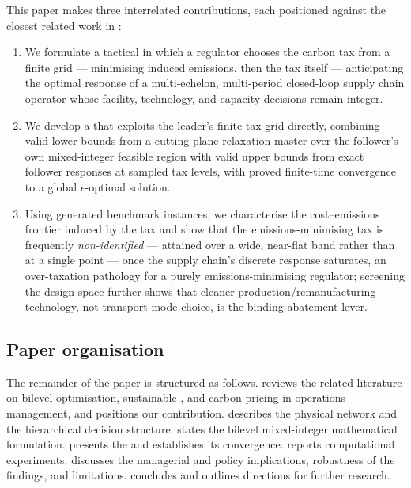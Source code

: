 This paper makes three interrelated contributions, each positioned
against the closest related work in :
\begin{enumerate}
  \item We formulate a tactical \BLMIP in which a regulator
        chooses the carbon tax from a finite grid --- minimising
        induced emissions, then the tax itself --- anticipating the
        optimal response of a multi-echelon, multi-period closed-loop
        supply chain operator whose facility, technology, and
        capacity decisions remain integer.
  \item We develop a \DBP that exploits the leader's
        finite tax grid directly, combining valid lower bounds from a
        cutting-plane relaxation master over the follower's own
        mixed-integer feasible region with valid upper bounds from
        exact follower responses at sampled tax levels, with proved
        finite-time convergence to a global $\epsilon$-optimal
        solution.
  \item Using generated benchmark instances, we characterise the
        cost--emissions frontier induced by the tax and show that the
        emissions-minimising tax is frequently \emph{non-identified}
        --- attained over a wide, near-flat band rather than at a
        single point --- once the supply chain's discrete response
        saturates, an over-taxation pathology for a purely
        emissions-minimising regulator; screening the design space
        further shows that cleaner production/remanufacturing
        technology, not transport-mode choice, is the binding
        abatement lever.
\end{enumerate}

\subsection{Paper organisation}
\label{sec:intro:organisation}

The remainder of the paper is structured as follows.
 reviews the related literature on bilevel
optimisation, sustainable \SCND, and carbon pricing in operations
management, and positions our contribution.
 describes the physical network and the
hierarchical decision structure.
 states the bilevel mixed-integer mathematical
formulation.
 presents the \DBP and establishes its
convergence.
 reports computational experiments.
 discusses the managerial and policy
implications, robustness of the findings, and limitations.
 concludes and outlines directions for
further research.
